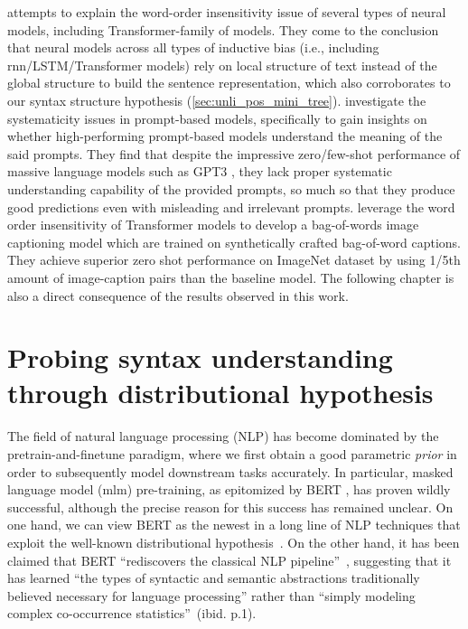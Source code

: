 \documentclass[letterpaper, 12pt]{report}
\begin{document}
\citep{clouatre-etal-2022-local} attempts to explain the word-order insensitivity issue of several types of neural models, including Transformer-family of models. They come to the conclusion that neural models across all types of inductive bias (i.e., including \acrshort{rnn}/LSTM/Transformer models) rely on local structure of text instead of the global structure to build the sentence representation, which also corroborates to our syntax structure hypothesis (\autoref{sec:unli_pos_mini_tree}).
\citet{webson-pavlick-2022-prompt} investigate the systematicity issues in prompt-based models, specifically to gain insights on whether high-performing prompt-based models understand the meaning of the said prompts. They find that despite the impressive zero/few-shot performance of massive language models such as GPT3 \citep{Brown2020:GPT3}, they lack proper systematic understanding capability of the provided prompts, so much so that they produce good predictions even with misleading and irrelevant prompts.
\citet{Tejankar2021AFO} leverage the word order insensitivity of Transformer models to develop a bag-of-words image captioning model which are trained on synthetically crafted bag-of-word captions. They achieve superior zero shot performance on ImageNet dataset by using 1/5th amount of image-caption pairs than the baseline model.
The following chapter is also a direct consequence of the results observed in this work.

\clearpage
\chapter{Probing syntax understanding through distributional hypothesis}
\label{sec:mlm}

The field of natural language processing (NLP) has become dominated by the pretrain-and-finetune paradigm, where we first obtain a good parametric \emph{prior} in order to subsequently model downstream tasks accurately.
In particular, masked language model (\acrshort{mlm}) pre-training, as epitomized by BERT \citep{devlin-etal-2019-bert}, has proven wildly successful, although the precise reason for this success has remained unclear.
On one hand, we can view BERT as the newest in a long line of NLP techniques  \cite{deerwester1990indexing, landauer1997solution, collobert2008unified, mikolov2013, peters-etal-2018-deep} that exploit the well-known distributional hypothesis~\cite{harris1954distributional}.
On the other hand, it has been claimed that BERT ``rediscovers the classical NLP pipeline''~\cite{tenney-etal-2019-bert}, suggesting that it has learned ``the types of syntactic and semantic abstractions traditionally believed necessary for language processing''
rather than ``simply modeling complex co-occurrence statistics''~(ibid. p.1).
\end{document}
